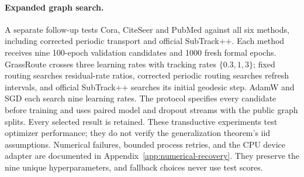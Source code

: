 \paragraph{Expanded graph search.}
A separate follow-up tests Cora, CiteSeer and PubMed against all six methods,
including corrected periodic transport and official SubTrack++. Each method
receives nine 100-epoch validation candidates and 1000 fresh formal epochs.
GrassRoute crosses three learning rates with tracking rates
$\{0.3,1,3\}$; fixed routing searches residual-rate ratios, corrected periodic
routing searches refresh intervals, and official SubTrack++ searches its
initial geodesic step. AdamW and SGD each search nine learning rates. The protocol specifies every candidate before training and uses paired
model and dropout streams with the public graph splits. Every selected
result is retained. These transductive experiments test optimizer
performance; they do not verify the generalization theorem's iid assumptions.
Numerical failures, bounded process retries, and the CPU device adapter are
documented in Appendix~\ref{app:numerical-recovery}. They preserve the
nine unique hyperparameters, and fallback choices never use test scores.

